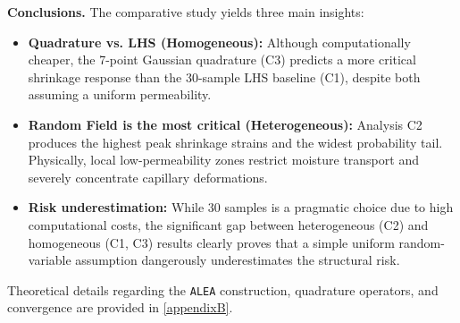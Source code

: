 \textbf{Conclusions.} The comparative study yields three main insights:
\begin{itemize}
    \item \textbf{Quadrature vs. LHS (Homogeneous):} Although computationally cheaper, the 7-point Gaussian quadrature (C3) predicts a more critical shrinkage response than the 30-sample LHS baseline (C1), despite both assuming a uniform permeability.
    \item \textbf{Random Field is the most critical (Heterogeneous):} Analysis C2 produces the highest peak shrinkage strains and the widest probability tail. Physically, local low-permeability zones restrict moisture transport and severely concentrate capillary deformations.
    \item \textbf{Risk underestimation:} While 30 samples is a pragmatic choice due to high computational costs, the significant gap between heterogeneous (C2) and homogeneous (C1, C3) results clearly proves that a simple uniform random-variable assumption dangerously underestimates the structural risk.
\end{itemize}
Theoretical details regarding the \texttt{ALEA} construction, quadrature operators, and convergence are provided in \cref{appendixB}.

    
